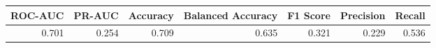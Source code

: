\begin{tabular}{rrrrrrr}
\toprule
ROC-AUC & PR-AUC & Accuracy & Balanced Accuracy & F1 Score & Precision & Recall \\
\midrule
0.701 & 0.254 & 0.709 & 0.635 & 0.321 & 0.229 & 0.536 \\
\bottomrule
\end{tabular}
